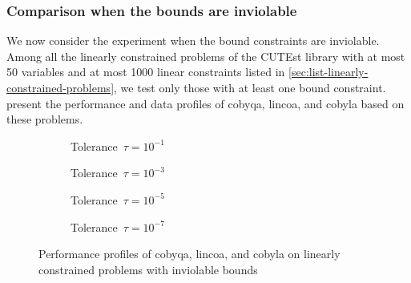 \subsubsection{Comparison when the bounds are inviolable}

We now consider the experiment when the bound constraints are inviolable.
Among all the linearly constrained problems of the CUTEst library with at most \num{50} variables and at most \num[group-minimum-digits=4]{1000} linear constraints listed in \cref{sec:list-linearly-constrained-problems}, we test only those with at least one bound constraint.
 present the performance and data profiles of \gls{cobyqa}, \gls{lincoa}, and \gls{cobyla} based on these problems.

\begin{figure}[ht]
    \centering
    \begin{subfigure}[b]{0.49\textwidth}
        \centering
        \caption{Tolerance~$\tau = 10^{-1}$}
    \end{subfigure}
    \hfill
    \begin{subfigure}[b]{0.49\textwidth}
        \centering
        \caption{Tolerance~$\tau = 10^{-3}$}
    \end{subfigure}
    \begin{subfigure}[b]{0.49\textwidth}
        \centering
        \caption{Tolerance~$\tau = 10^{-5}$}
    \end{subfigure}
    \hfill
    \begin{subfigure}[b]{0.49\textwidth}
        \centering
        \caption{Tolerance~$\tau = 10^{-7}$}
    \end{subfigure}
    \caption[Performance profiles on linearly constrained problems with bounds]{Performance profiles of \gls{cobyqa}, \gls{lincoa}, and \gls{cobyla} on linearly constrained problems with inviolable bounds}
    \label{fig:perf-linearly-constrained-problems-bounds}
\end{figure}

